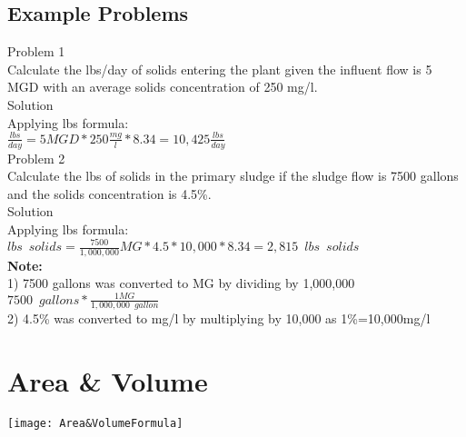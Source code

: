 \section{Example Problems}

Problem 1\\Calculate the lbs/day of solids entering the plant given the influent flow is 5 MGD with an average solids concentration  of 250 mg/l.\\

Solution\\

Applying lbs formula:\\
$\frac{lbs}{day}=5 MGD *250\frac{mg}{l}*8.34 = \boxed{10,425\frac{lbs}{day}}$
\\
\vspace{6pt}
Problem 2\\Calculate the lbs of solids in the primary sludge if the sludge flow is 7500 gallons and the solids concentration is 4.5\%.\\
Solution\\
Applying lbs formula:\\
$lbs \enspace solids = \frac{7500}{1,000,000}MG * 4.5*10,000 *8.34 = \boxed{2,815 \enspace lbs \enspace solids}$\\
\textbf{Note:}\\  
1) 7500 gallons was converted to MG by dividing by 1,000,000\\
$7500 \enspace gallons * \frac{1 MG}{1,000,000 \enspace gallon}$\\
2) 4.5\% was converted to mg/l by multiplying by 10,000 as 1\%=10,000mg/l


\chapter{Area \& Volume}


\begin{center}
\texttt{[image: Area\&VolumeFormula]}
\end{center}
